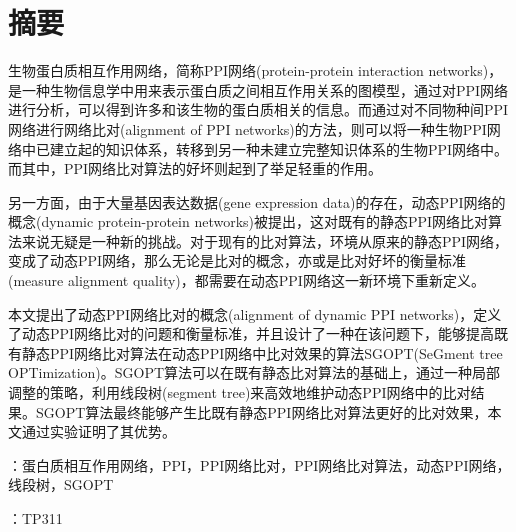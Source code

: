 \chapter*{摘要}
生物蛋白质相互作用网络，简称PPI网络(protein-protein interaction networks)，是一种生物信息学中用来表示蛋白质之间相互作用关系的图模型，通过对PPI网络进行分析，可以得到许多和该生物的蛋白质相关的信息。而通过对不同物种间PPI网络进行网络比对(alignment of PPI networks)的方法，则可以将一种生物PPI网络中已建立起的知识体系，转移到另一种未建立完整知识体系的生物PPI网络中。而其中，PPI网络比对算法的好坏则起到了举足轻重的作用。

另一方面，由于大量基因表达数据(gene expression data)的存在，动态PPI网络的概念(dynamic protein-protein networks)被提出，这对既有的静态PPI网络比对算法来说无疑是一种新的挑战。对于现有的比对算法，环境从原来的静态PPI网络，变成了动态PPI网络，那么无论是比对的概念，亦或是比对好坏的衡量标准(measure alignment quality)，都需要在动态PPI网络这一新环境下重新定义。

本文提出了动态PPI网络比对的概念(alignment of dynamic PPI networks)，定义了动态PPI网络比对的问题和衡量标准，并且设计了一种在该问题下，能够提高既有静态PPI网络比对算法在动态PPI网络中比对效果的算法SGOPT(SeGment tree OPTimization)。SGOPT算法可以在既有静态比对算法的基础上，通过一种局部调整的策略，利用线段树(segment tree)来高效地维护动态PPI网络中的比对结果。SGOPT算法最终能够产生比既有静态PPI网络比对算法更好的比对效果，本文通过实验证明了其优势。


：蛋白质相互作用网络，PPI，PPI网络比对，PPI网络比对算法，动态PPI网络，线段树，SGOPT

：TP311